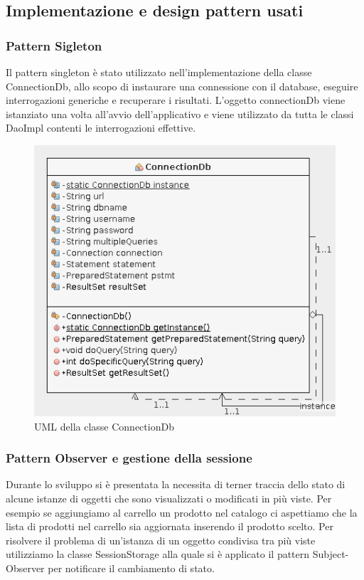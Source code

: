 \documentclass{article}
\begin{document}
\subsection{Implementazione e design pattern usati}
\newpage
\subsubsection{Pattern Sigleton}
Il pattern singleton è stato utilizzato nell'implementazione della classe ConnectionDb, allo scopo di
instaurare una connessione con il database, eseguire interrogazioni generiche e recuperare i risultati.
L'oggetto connectionDb viene istanziato una volta all'avvio dell'applicativo e viene utilizzato
da tutta le classi DaoImpl contenti le interrogazioni effettive.
\begin{figure}[h!]
	\centering
	\includegraphics[width=\textwidth]{UmlConnectionDb.png}
	\caption{UML della classe ConnectionDb}
	\label{fig:UmlProdotto}
\end{figure}
\newpage

\subsubsection{Pattern Observer e gestione della sessione}
Durante lo sviluppo si è presentata la necessita di terner traccia dello stato di alcune istanze di oggetti che
sono visualizzati o modificati in più viste.
Per esempio se aggiungiamo al carrello un prodotto nel catalogo ci aspettiamo che la lista di prodotti nel
carrello sia aggiornata inserendo il prodotto scelto.
Per risolvere il problema di un'istanza di un oggetto condivisa tra più viste utilizziamo la classe SessionStorage
alla quale si è applicato il pattern Subject-Observer per notificare il cambiamento di stato.
\end{document}
